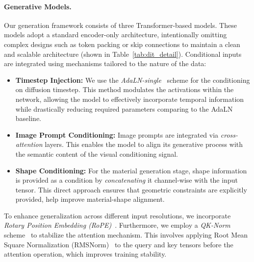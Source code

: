 \documentclass[10pt,twocolumn,letterpaper]{article}
\begin{document}
\paragraph{Generative Models.}
Our generation framework consists of three Transformer-based models. These models adopt a standard encoder-only architecture, intentionally omitting complex designs such as token packing or skip connections to maintain a clean and scalable architecture (shown in Table~\ref{tab:dit_detail}). Conditional inputs are integrated using  mechanisms tailored to the nature of the data:
\begin{itemize}
    \item \textbf{Timestep Injection:} We use the \emph{AdaLN-single}~\cite{chen2024pixart} scheme for the conditioning on diffusion timestep. This method modulates the activations within the network, allowing the model to effectively incorporate temporal information while drastically reducing required parameters comparing to the AdaLN baseline.
    \item \textbf{Image Prompt Conditioning:} Image prompts are integrated via \emph{cross-attention} layers. This enables the model to align its generative process with the semantic content of the visual conditioning signal.
    \item \textbf{Shape Conditioning:} For the material generation stage, shape information is provided as a condition by \emph{concatenating} it channel-wise with the input tensor. This direct approach ensures that geometric constraints are explicitly provided, help improve material-shape alignment.
\end{itemize}

\noindent To enhance generalization across different input resolutions, we incorporate \emph{Rotary Position Embedding (RoPE)}~\cite{su2024roformer}. Furthermore, we employ a \emph{QK-Norm} scheme~\cite{esser2024scaling} to stabilize the attention mechanism. This involves applying Root Mean Square Normalization (RMSNorm)~\cite{zhang2019root} to the query and key tensors before the attention operation, which improves training stability.
\end{document}
